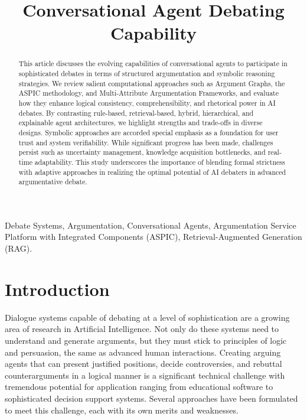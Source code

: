 \documentclass[conference]{IEEEtran}
\begin{document}
\title{Conversational Agent Debating Capability}

\author{
\and
{}
}

\maketitle

\begin{abstract}
This article discusses the evolving capabilities of conversational agents to participate in sophisticated debates in terms of structured argumentation and symbolic reasoning strategies. We review salient computational approaches such as Argument Graphs, the ASPIC methodology, and Multi-Attribute Argumentation Frameworks, and evaluate how they enhance logical consistency, comprehensibility, and rhetorical power in AI debates. By contrasting rule-based, retrieval-based, hybrid, hierarchical, and explainable agent architectures, we highlight strengths and trade-offs in diverse designs. Symbolic approaches are accorded special emphasis as a foundation for user trust and system verifiability. While significant progress has been made, challenges persist such as uncertainty management, knowledge acquisition bottlenecks, and real-time adaptability. This study underscores the importance of blending formal strictness with adaptive approaches in realizing the optimal potential of AI debaters in advanced argumentative debate.
\end{abstract}

\begin{IEEEkeywords}
Debate Systems, Argumentation, Conversational Agents, Argumentation Service Platform with Integrated Components (ASPIC), Retrieval-Augmented Generation (RAG).
\end{IEEEkeywords}

\section{Introduction}
Dialogue systems capable of debating at a level of sophistication are a growing area of research in Artificial Intelligence. Not only do these systems need to understand and generate arguments, but they must stick to principles of logic and persuasion, the same as advanced human interactions. Creating arguing agents that can present justified positions, decide controversies, and rebuttal counterarguments in a logical manner is a significant technical challenge with tremendous potential for application ranging from educational software to sophisticated decision support systems. Several approaches have been formulated to meet this challenge, each with its own merits and weaknesses.
\end{document}
